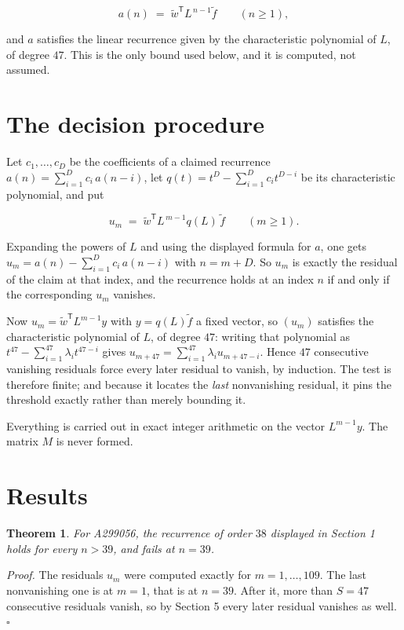 \documentclass[11pt]{article}
\newtheorem{theorem}{Theorem}
\theoremstyle{definition}
\begin{document}
\[a(n) \;=\; \tilde w^{\mathsf T} L^{\,n-1} \tilde f \qquad (n \ge 1),\]

and $a$ satisfies the linear recurrence given by the characteristic polynomial of $L$, of degree $47$. This is the only bound used below, and it is computed, not assumed.

\section{The decision procedure}

Let $c_1,\dots,c_D$ be the coefficients of a claimed recurrence $a(n) = \sum_{i=1}^{D} c_i\,a(n-i)$, let $q(t) = t^{D} - \sum_{i=1}^{D} c_i t^{D-i}$ be its characteristic polynomial, and put

\[u_m \;=\; \tilde w^{\mathsf T} L^{\,m-1} q(L)\,\tilde f \qquad (m \ge 1).\]

Expanding the powers of $L$ and using the displayed formula for $a$, one gets $u_m = a(n) - \sum_{i=1}^{D} c_i\,a(n-i)$ with $n = m + D$. So $u_m$ is exactly the residual of the claim at that index, and the recurrence holds at an index $n$ if and only if the corresponding $u_m$ vanishes.

Now $u_m = \tilde w^{\mathsf T} L^{m-1} y$ with $y = q(L)\tilde f$ a fixed vector, so $(u_m)$ satisfies the characteristic polynomial of $L$, of degree $47$: writing that polynomial as $t^{47} - \sum_{i=1}^{47} \lambda_i t^{47-i}$ gives $u_{m+47} = \sum_{i=1}^{47} \lambda_i u_{m+47-i}$. Hence $47$ consecutive vanishing residuals force every later residual to vanish, by induction. The test is therefore finite; and because it locates the {\itshape last} nonvanishing residual, it pins the threshold exactly rather than merely bounding it.

Everything is carried out in exact integer arithmetic on the vector $L^{m-1}y$. The matrix $M$ is never formed.

\section{Results}

\begin{theorem} For A299056, the recurrence of order $38$ displayed in Section 1 holds for every $n > 39$, and fails at $n = 39$.\end{theorem}

{\itshape Proof.} The residuals $u_m$ were computed exactly for $m = 1,\dots,109$. The last nonvanishing one is at $m = 1$, that is at $n = 39$. After it, more than $S = 47$ consecutive residuals vanish, so by Section 5 every later residual vanishes as well. $\square$
\end{document}
